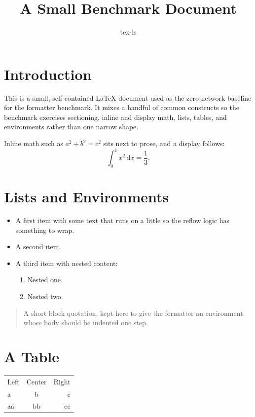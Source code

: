 \documentclass{article}
\title{A Small Benchmark Document}
\author{tex-ls}
\begin{document}
\maketitle

\section{Introduction}

This is a small, self-contained \LaTeX{} document used as the zero-network
baseline for the formatter benchmark. It mixes a handful of common constructs so
the benchmark exercises sectioning, inline and display math, lists, tables, and
environments rather than one narrow shape.

Inline math such as $a^2 + b^2 = c^2$ sits next to prose, and a display follows:
\begin{equation}
    \int_0^1 x^2 \, \mathrm{d}x = \frac{1}{3}.
\end{equation}

\section{Lists and Environments}

\begin{itemize}
    \item A first item with some text that runs on a little so the reflow logic
          has something to wrap.
    \item A second item.
    \item A third item with nested content:
        \begin{enumerate}
            \item Nested one.
            \item Nested two.
        \end{enumerate}
\end{itemize}

\begin{quote}
    A short block quotation, kept here to give the formatter an environment whose
    body should be indented one step.
\end{quote}

\section{A Table}

\begin{tabular}{lcr}
    Left & Center & Right \\
    a & b & c \\
    aa & bb & cc \\
\end{tabular}
\end{document}
